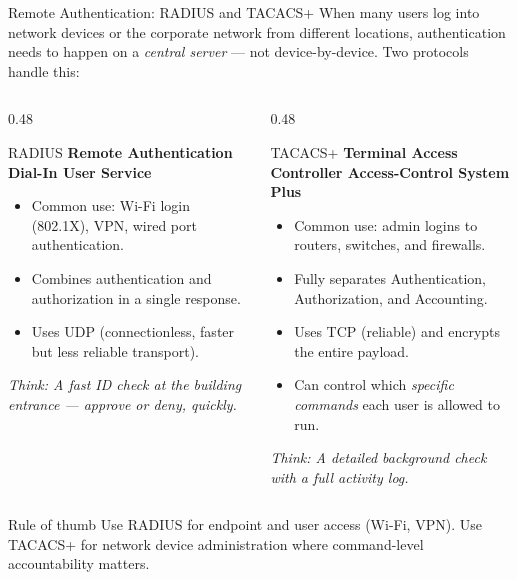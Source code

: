 \documentclass[aspectratio=169]{beamer}  %
\begin{document}
\begin{frame}{Remote Authentication: RADIUS and TACACS+}
    \footnotesize
    When many users log into network devices or the corporate network from different locations, authentication needs to happen on a \emph{central server} --- not device-by-device. Two protocols handle this:

    \vspace{0.4em}
    \begin{columns}[T]
        \begin{column}{0.48\textwidth}
            \begin{block}{RADIUS}
                \footnotesize
                \textbf{Remote Authentication Dial-In User Service}
                \begin{itemize}
                    \item Common use: Wi-Fi login (802.1X), VPN, wired port authentication.
                    \item Combines authentication and authorization in a single response.
                    \item Uses UDP (connectionless, faster but less reliable transport).
                \end{itemize}
                \emph{Think: A fast ID check at the building entrance --- approve or deny, quickly.}
            \end{block}
        \end{column}
        \begin{column}{0.48\textwidth}
            \begin{block}{TACACS+}
                \footnotesize
                \textbf{Terminal Access Controller Access-Control System Plus}
                \begin{itemize}
                    \item Common use: admin logins to routers, switches, and firewalls.
                    \item Fully separates Authentication, Authorization, and Accounting.
                    \item Uses TCP (reliable) and encrypts the entire payload.
                    \item Can control which \emph{specific commands} each user is allowed to run.
                \end{itemize}
                \emph{Think: A detailed background check with a full activity log.}
            \end{block}
        \end{column}
    \end{columns}

    \vspace{0.3em}
    \begin{exampleblock}{Rule of thumb}
        \footnotesize
        Use RADIUS for endpoint and user access (Wi-Fi, VPN). Use TACACS+ for network device administration where command-level accountability matters.
    \end{exampleblock}
\end{frame}
\end{document}
